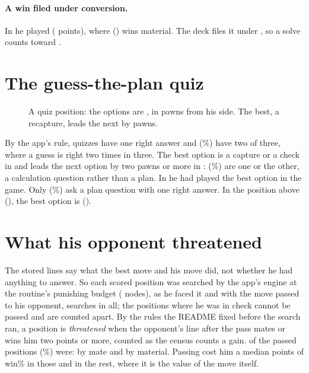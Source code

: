 \documentclass[11pt]{article}
\begin{document}
\paragraph{A win filed under conversion.} In \WinFen{} he played \WinPlayed{} (\WinDrop{}
points), where \WinLine{} (\WinUci) wins material. The deck files it under \WinTheme, so a solve
counts toward \WinSkill.

\section{The guess-the-plan quiz}

\begin{figure}[h]
\centering
\QuizBoard
\caption{A quiz position: the options are \QuizOptions, in pawns from his side. The best, a
recapture, leads the next by \QuizLead{} pawns.}
\end{figure}

By the app's rule, \OneRight{} quizzes have one right answer and \TwoRight{} (\TwoRightShare\%)
have two of three, where a guess is right two times in three. The best option is a capture or a
check in \Forcing{} and leads the next option by two pawns or more in \Material: \ForcingOrMaterial{}
(\ForcingShare\%) are one or the other, a calculation question rather than a plan. In \PlayedBest{}
he had played the best option in the game. Only \PlanQuestions{} (\PlanShare\%) ask a plan question
with one right answer. In the position above (\QuizFen), the best option is \QuizLine{} (\QuizUci).

\section{What his opponent threatened}

The stored lines say what the best move and his move did, not whether he had anything to answer.
So each scored position was searched by the app's engine at the routine's punishing budget
(\Budget{} nodes), as he faced it and with the move passed to his opponent, \Searches{} searches in
all; the \InCheck{} positions where he was in check cannot be passed and are counted apart. By the
rules the README fixed before the search ran, a position is \emph{threatened} when the opponent's
line after the pass mates or wins him two points or more, counted as the census counts a gain.
\Threatened{} of the \Searched{} passed positions (\ThreatShare\%) were: \ThreatMate{} by mate and
\ThreatMaterial{} by material. Passing cost him a median \PassThreat{} points of win\% in those and
\PassNot{} in the rest, where it is the value of the move itself.
\end{document}
